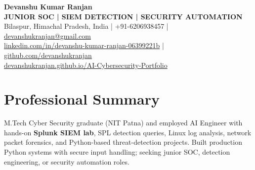 \documentclass[a4paper,11pt]{article}
\begin{document}
\begin{center}
{\fontsize{17.3}{20}\selectfont\bfseries Devanshu Kumar Ranjan}\\[2pt]
{\small\bfseries JUNIOR SOC | SIEM DETECTION | SECURITY AUTOMATION}\\[4pt]
{\footnotesize Bilaspur, Himachal Pradesh, India \quad | \quad +91-6206938457 \quad | \quad \href{mailto:devanshukranjan@gmail.com}{devanshukranjan@gmail.com}}\\[2pt]
{\footnotesize \href{https://linkedin.com/in/devanshu-kumar-ranjan-06399221b}{linkedin.com/in/devanshu-kumar-ranjan-06399221b} \quad | \quad \href{https://github.com/devanshukranjan}{github.com/devanshukranjan}}\\[2pt]
{\footnotesize \href{https://devanshukranjan.github.io/AI-Cybersecurity-Portfolio/}{devanshukranjan.github.io/AI-Cybersecurity-Portfolio}}
\end{center}
\vspace{-6pt}
\section{Professional Summary}
\small M.Tech Cyber Security graduate (NIT Patna) and employed AI Engineer with hands-on \textbf{Splunk SIEM lab}, SPL detection queries, Linux log analysis, network packet forensics, and Python-based threat-detection projects. Built production Python systems with secure input handling; seeking junior SOC, detection engineering, or security automation roles.\normalsize
\end{document}
